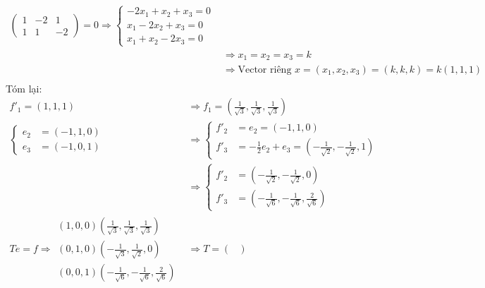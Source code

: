 \begin{enumerate}
\begin{enumerate}
\begin{align*}
\begin{pmatrix}
                1 & -2 & 1\\
                1 & 1 & -2
            \end{pmatrix} = 0 \Rightarrow \begin{cases}
                -2x_1 + x_2 + x_3 = 0\\
                x_1 - 2x_2 + x_3 = 0\\
                x_1 + x_2 - 2x_3 = 0
            \end{cases}\\
            &\Rightarrow x_1 = x_2 = x_3 = k\\
            &\Rightarrow \textrm{Vector riêng } x = (x_1, x_2, x_3) = (k, k, k) = k(1,1,1)\\
        \end{align*}
        Tóm lại:
        \begin{align*}
            f'_1 = (1, 1, 1) &\Rightarrow f_1 = \left(\frac{1}{\sqrt{3}},\frac{1}{\sqrt{3}},\frac{1}{\sqrt{3}}\right)\\
            \begin{cases}
                e_2 &= (-1, 1, 0)\\
                e_3 &= (-1, 0, 1)    
            \end{cases} &\Rightarrow \begin{cases}
                f'_2 &= e_2 = (-1, 1, 0)\\
                f'_3 &= -\frac{1}{2}e_2+ e_3 = \left(-\frac{1}{\sqrt{2}}, -\frac{1}{\sqrt{2}}, 1\right)
            \end{cases}\\
            &\Rightarrow \begin{cases}
                f'_2 &= \left( -\frac{1}{\sqrt{2}}, -\frac{1}{\sqrt{2}}, 0 \right)\\
                f'_3 &= \left( -\frac{1}{\sqrt{6}}, -\frac{1}{\sqrt{6}}, \frac{2}{\sqrt{6}} \right)
            \end{cases}\\
            Te=f \Rightarrow \begin{matrix}
                (1,0,0) \left(\frac{1}{\sqrt{3}},\frac{1}{\sqrt{3}},\frac{1}{\sqrt{3}}\right)\\
                (0,1,0) \left( -\frac{1}{\sqrt{3}}, \frac{1}{\sqrt{2}}, 0 \right)\\
                (0,0,1) \left( -\frac{1}{\sqrt{6}}, -\frac{1}{\sqrt{6}}, \frac{2}{\sqrt{6}} \right) 
            \end{matrix}&\Rightarrow T = \begin{pmatrix}

\end{pmatrix}
\end{align*}
\end{enumerate}
\end{enumerate}
